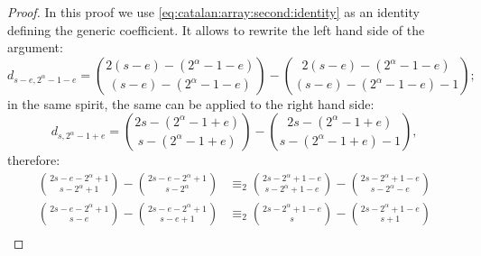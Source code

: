 \begin{proof}
In this proof we use \autoref{eq:catalan:array:second:identity} as 
an identity defining the generic coefficient. It allows to rewrite the left hand side 
of the argument:
\begin{displaymath}
    d_{s-e,2^{{\alpha}}-1-e}= {{2(s-e)-(2^{{\alpha}}-1-e)}\choose{(s-e)-(2^{{\alpha}}-1-e)}}
        - {{2(s-e)-(2^{{\alpha}}-1-e)}\choose{(s-e)-(2^{{\alpha}}-1-e)-1}};
\end{displaymath}
in the same spirit, the same can be applied to the right hand side:
\begin{displaymath}
    d_{s,2^{{\alpha}}-1+e}={{2s-(2^{{\alpha}}-1+e)}\choose{s-(2^{{\alpha}}-1+e)}}
        - {{2s-(2^{{\alpha}}-1+e)}\choose{s-(2^{{\alpha}}-1+e)-1}},
\end{displaymath}
therefore:
\begin{displaymath}
    \begin{split}
        {{2s-e-2^{{\alpha}}+1}\choose{s-2^{{\alpha}}+1}}
            - {{2s-e-2^{{\alpha}}+1}\choose{s-2^{{\alpha}}}}
        &\equiv_{2}
        {{2s-2^{{\alpha}}+1-e}\choose{s-2^{{\alpha}}+1-e}}
            - {{2s-2^{{\alpha}}+1-e}\choose{s-2^{{\alpha}}-e}}\\
        {{2s-e-2^{{\alpha}}+1}\choose{s-e}}
            - {{2s-e-2^{{\alpha}}+1}\choose{s-e+1}}
        &\equiv_{2}
        {{2s-2^{{\alpha}}+1-e}\choose{s}}
            - {{2s-2^{{\alpha}}+1-e}\choose{s+1}}\\
    \end{split}
\end{displaymath}


\end{proof}
